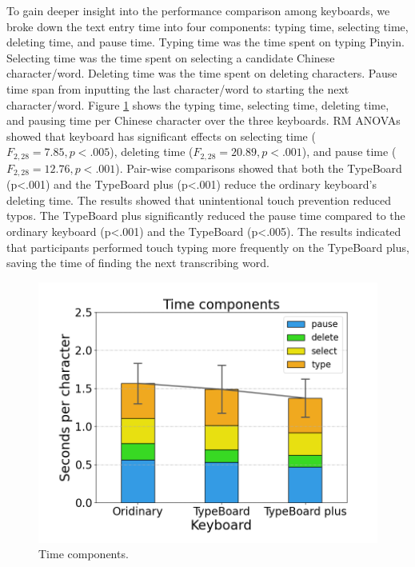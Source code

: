 To gain deeper insight into the performance comparison among keyboards, we broke down the text entry time into four components: typing time, selecting time, deleting time, and pause time. Typing time was the time spent on typing Pinyin. Selecting time was the time spent on selecting a candidate Chinese character/word. Deleting time was the time spent on deleting characters. Pause time span from inputting the last character/word to starting the next character/word. Figure \ref{fig:time_components} shows the typing time, selecting time, deleting time, and pausing time per Chinese character over the three keyboards. RM ANOVAs showed that keyboard has significant effects on selecting time ($F_{2,28}=7.85,p<.005$), deleting time ($F_{2,28}=20.89,p<.001$), and pause time ($F_{2,28}=12.76,p<.001$).
Pair-wise comparisons showed that both the TypeBoard (p<.001) and the TypeBoard plus (p<.001) reduce the ordinary keyboard's deleting time. The results showed that unintentional touch prevention reduced typos.
The TypeBoard plus significantly reduced the pause time compared to the ordinary keyboard (p<.001) and the TypeBoard (p<.005). The results indicated that participants performed touch typing more frequently on the TypeBoard plus, saving the time of finding the next transcribing word.

\begin{figure}[!tbh]
	\includegraphics[width=0.6\linewidth]{figures/time_components.png}
	\centering
	\caption{Time components.}
	\label{fig:time_components}
\end{figure}


